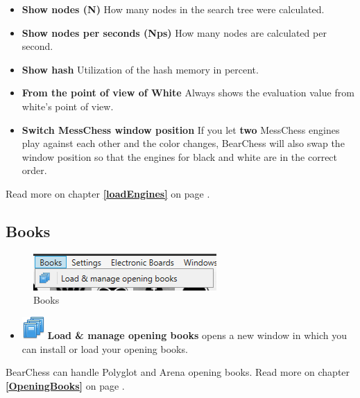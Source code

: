 \documentclass[11pt,a4paper]{article}
\begin{document}
\begin{itemize}
	\item  \textbf{Show nodes (N)} How many nodes in the search tree were calculated.
	\item \textbf{Show nodes per seconds (Nps)} How many nodes are calculated per second.
	\item \textbf{Show hash} Utilization of the hash memory in percent.
	\item \textbf{From the point of view of White} Always shows the evaluation value from white's point of view.
	\item \textbf{Switch MessChess window position} If you let \textbf{two} MessChess engines play against each other and the color changes, BearChess will also swap the window position so that the engines for black and white are in the correct order.
\end{itemize}

Read more on chapter \textbf{\ref{loadEngines}  } on page \pageref{loadEngines}.

\subsection{Books}
\begin{figure}[H]
	\centering
	\includegraphics[scale=1.0]{Books.png}
	\caption{Books}
	\label{fig:Books}
\end{figure}
\begin{itemize}
	\item \includegraphics[scale=0.5]{books_stack.png} \textbf{Load \& manage opening books} opens a new window in which you can install or load  your opening books.
\end{itemize}
BearChess can handle Polyglot and Arena opening books. Read more on chapter \textbf{\ref{OpeningBooks}  } on page \pageref{OpeningBooks}.
\end{document}
